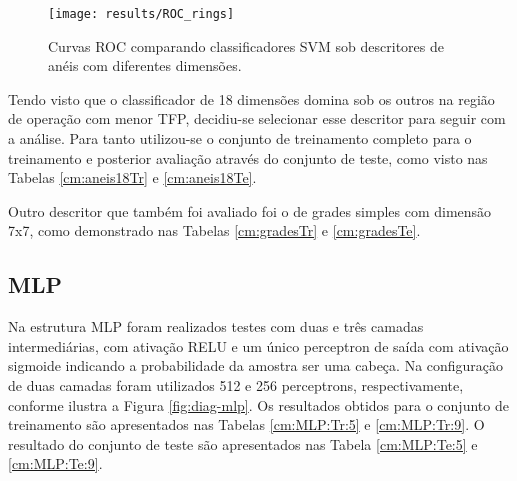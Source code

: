 \begin{table}
\end{table}

\begin{figure}
\centering
\texttt{[image: results/ROC\_rings]}
\caption{Curvas ROC comparando classificadores SVM sob descritores de anéis com diferentes dimensões.}
\label{fig:roc-rings}
\end{figure}

Tendo visto que o classificador de 18 dimensões domina sob os outros na região de operação com menor TFP, decidiu-se selecionar esse descritor para seguir com a análise. Para tanto utilizou-se o conjunto de treinamento completo para o treinamento e posterior avaliação através do conjunto de teste, como visto nas Tabelas \ref{cm:aneis18Tr} e \ref{cm:aneis18Te}.

\begin{table}
\end{table}

Outro descritor que também foi avaliado foi o de grades simples com dimensão 7x7, como demonstrado nas Tabelas \ref{cm:gradesTr} e \ref{cm:gradesTe}.

\begin{table}
\end{table}

\subsection{MLP}
Na estrutura MLP foram realizados testes com duas e três camadas intermediárias, com ativação RELU e um único perceptron de saída com ativação sigmoide indicando a probabilidade da amostra ser uma cabeça. Na configuração de duas camadas foram utilizados 512 e 256 perceptrons, respectivamente, conforme ilustra a Figura \ref{fig:diag-mlp}. Os resultados obtidos para o conjunto de treinamento são apresentados nas Tabelas \ref{cm:MLP:Tr:5} e \ref{cm:MLP:Tr:9}. O resultado do conjunto de teste são apresentados nas Tabela \ref{cm:MLP:Te:5} e \ref{cm:MLP:Te:9}.

